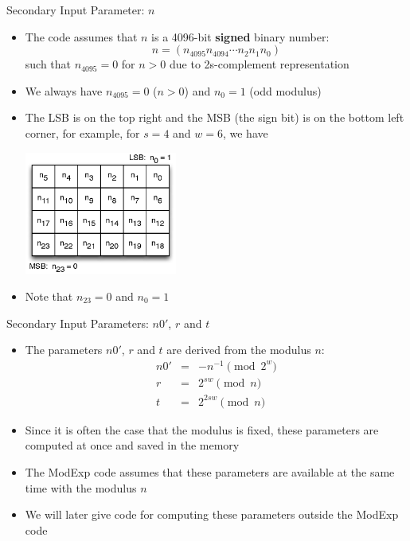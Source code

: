 \documentclass[xcolor=dvipsnames]{beamer}
\begin{document}
\begin{frame}{Secondary Input Parameter: $n$}
\begin{itemize}

\item The code assumes that $n$ is a 4096-bit \textbf{signed} binary number:
\[
n=(n_{4095}n_{4094}\cdots n_2n_1n_0)
\]
such that $n_{4095}=0$ for $n>0$ due to 2s-complement representation
\item We always have $n_{4095}=0$ ($n>0$) and $n_0=1$ (odd modulus)

\item The LSB is on the top right and
the MSB (the sign bit) is on the bottom left corner, for example,
for $s=4$ and $w=6$, we have

\centerline{\includegraphics[width=5cm]{n24.eps}}

\item Note that $n_{23}=0$ and $n_0=1$

\end{itemize}
\end{frame}

\begin{frame}{Secondary Input Parameters: $n0'$, $r$ and $t$}
\begin{itemize}

\item The parameters $n0'$, $r$ and $t$ are derived from the modulus $n$:
\begin{eqnarray*}
n0' & = & -n^{-1} \pmod{2^w} \\
r   & = & 2^{sw} \pmod{n} \\
t   & = & 2^{2sw} \pmod{n}
\end{eqnarray*}

\item Since it is often the case that the modulus is fixed, these parameters
are computed at once and saved in the memory
\item The ModExp code assumes that these parameters are available at the
same time with the modulus $n$
\item We will later give code for computing these parameters 
outside the ModExp code

\end{itemize}
\end{frame}
\end{document}
